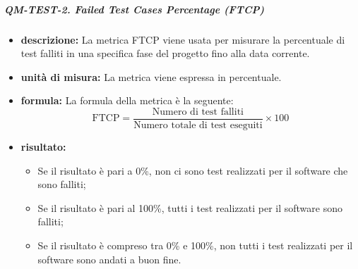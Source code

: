             \subparagraph{QM-TEST-2. Failed Test Cases Percentage (FTCP)}
            \begin{itemize}
                \item \textbf{descrizione: }
                La metrica FTCP viene usata per misurare la percentuale di test falliti in una specifica fase del progetto fino alla data corrente.

                \item \textbf{unità di misura: }
                La metrica viene espressa in percentuale.

                \item \textbf{formula: }
                La formula della metrica è la seguente:
                \[
                    \text{FTCP} = \frac{\text{Numero di test falliti}}{\text{Numero totale di test eseguiti}} \times 100
                \]

                \item \textbf{risultato: }
                \begin{itemize}
                    \item Se il risultato è pari a 0\%, non ci sono test realizzati per il software che sono falliti;
                    \item Se il risultato è pari al 100\%, tutti i test realizzati per il software sono falliti;
                    \item Se il risultato è compreso tra 0\% e 100\%, non tutti i test realizzati per il software sono andati a buon fine.
                \end{itemize}
            \end{itemize}

